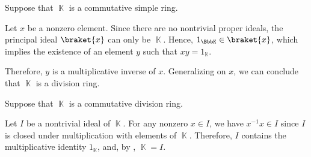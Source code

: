 \begin{defproof}
   Suppose that \( \BbbK \) is a commutative simple ring.

  Let \( x \) be a nonzero element. Since there are no nontrivial proper ideals, the principal ideal \( \braket{ x } \) can only be \( \BbbK \). Hence, \( 1_\BbbK \in \braket{ x } \), which implies the existence of an element \( y \) such that \( xy = 1_\BbbK \).

  Therefore, \( y \) is a multiplicative inverse of \( x \). Generalizing on \( x \), we can conclude that \( \BbbK \) is a division ring.

   Suppose that \( \BbbK \) is a commutative division ring.

  Let \( I \) be a nontrivial ideal of \( \BbbK \). For any nonzero \( x \in I \), we have \( x^{-1} x \in I \) since \( I \) is closed under multiplication with elements of \( \BbbK \). Therefore, \( I \) contains the multiplicative identity \( 1_\BbbK \), and, by , \( \BbbK = I \).
\end{defproof}

